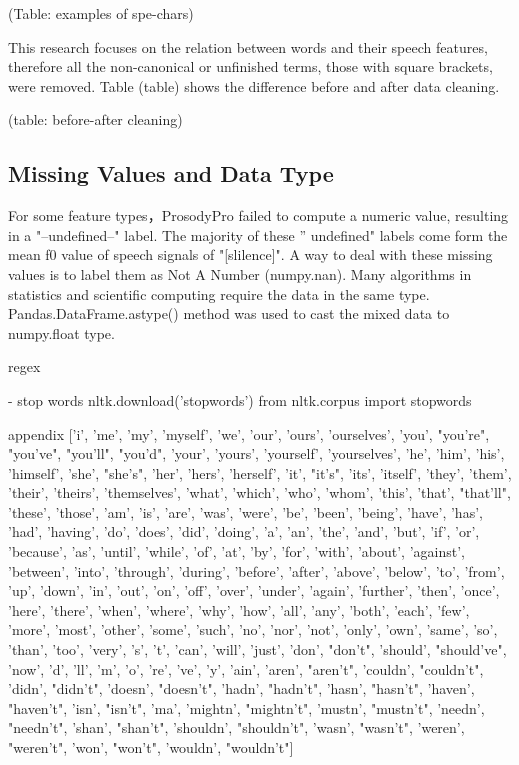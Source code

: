 (Table: examples of spe-chars)

This research focuses on the relation between words and their speech features, therefore all the non-canonical  or unfinished terms, those with square brackets, were removed. Table (table) shows the difference before and after data cleaning.

(table: before-after cleaning)


\subsection{Missing Values and Data Type }
 For some feature types，ProsodyPro failed to compute a numeric value, resulting in a "--undefined--" label. The majority of these '' undefined" labels come form the mean f0 value of speech signals of "[slilence]". A way to deal with these missing values is to label them as Not A Number (numpy.nan). Many algorithms in statistics and scientific computing require the data in the same type. Pandas.DataFrame.astype() method was used to cast the mixed data to numpy.float type.


regex

- stop words
nltk.download('stopwords')
from nltk.corpus import stopwords

appendix
['i', 'me', 'my', 'myself', 'we', 'our', 'ours', 'ourselves', 'you', "you're", "you've", "you'll", "you'd", 'your', 'yours', 'yourself', 'yourselves', 'he', 'him', 'his', 'himself', 'she', "she's", 'her', 'hers', 'herself', 'it', "it's", 'its', 'itself', 'they', 'them', 'their', 'theirs', 'themselves', 'what', 'which', 'who', 'whom', 'this', 'that', "that'll", 'these', 'those', 'am', 'is', 'are', 'was', 'were', 'be', 'been', 'being', 'have', 'has', 'had', 'having', 'do', 'does', 'did', 'doing', 'a', 'an', 'the', 'and', 'but', 'if', 'or', 'because', 'as', 'until', 'while', 'of', 'at', 'by', 'for', 'with', 'about', 'against', 'between', 'into', 'through', 'during', 'before', 'after', 'above', 'below', 'to', 'from', 'up', 'down', 'in', 'out', 'on', 'off', 'over', 'under', 'again', 'further', 'then', 'once', 'here', 'there', 'when', 'where', 'why', 'how', 'all', 'any', 'both', 'each', 'few', 'more', 'most', 'other', 'some', 'such', 'no', 'nor', 'not', 'only', 'own', 'same', 'so', 'than', 'too', 'very', 's', 't', 'can', 'will', 'just', 'don', "don't", 'should', "should've", 'now', 'd', 'll', 'm', 'o', 're', 've', 'y', 'ain', 'aren', "aren't", 'couldn', "couldn't", 'didn', "didn't", 'doesn', "doesn't", 'hadn', "hadn't", 'hasn', "hasn't", 'haven', "haven't", 'isn', "isn't", 'ma', 'mightn', "mightn't", 'mustn', "mustn't", 'needn', "needn't", 'shan', "shan't", 'shouldn', "shouldn't", 'wasn', "wasn't", 'weren', "weren't", 'won', "won't", 'wouldn', "wouldn't"]

